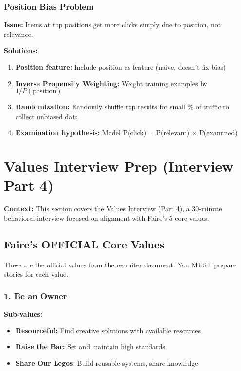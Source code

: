 \documentclass[11pt,letterpaper]{article}
\begin{document}
\subsubsection{Position Bias Problem}

\textbf{Issue:} Items at top positions get more clicks simply due to position, not relevance.

\textbf{Solutions:}
\begin{enumerate}
    \item \textbf{Position feature:} Include position as feature (naive, doesn't fix bias)
    \item \textbf{Inverse Propensity Weighting:} Weight training examples by $1/P(\text{position})$
    \item \textbf{Randomization:} Randomly shuffle top results for small \% of traffic to collect unbiased data
    \item \textbf{Examination hypothesis:} Model P(click) = P(relevant) $\times$ P(examined)
\end{enumerate}

\section{Values Interview Prep (Interview Part 4)}

\textbf{Context:} This section covers the Values Interview (Part 4), a 30-minute behavioral interview focused on alignment with Faire's 5 core values.

\subsection{Faire's OFFICIAL Core Values}

These are the official values from the recruiter document. You MUST prepare stories for each value.

\subsubsection{1. Be an Owner}

\textbf{Sub-values:}
\begin{itemize}
    \item \textbf{Resourceful:} Find creative solutions with available resources
    \item \textbf{Raise the Bar:} Set and maintain high standards
    \item \textbf{Share Our Legos:} Build reusable systems, share knowledge
\end{itemize}
\end{document}
